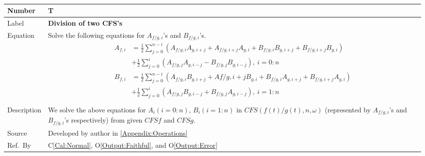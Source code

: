 \documentclass[12pt]{article}
\newcommand{\colAwidth}{0.13\textwidth}
\newcommand{\colBwidth}{0.82\textwidth}
\newcounter{theorynum} %
\newcommand{\calref}[1]{C\ref{#1}}
\newcommand{\oref}[1]{O\ref{#1}}
\begin{document}
~\newline
\noindent
\begin{minipage}{\textwidth}
	\renewcommand*{\arraystretch}{1.5}
	\begin{tabular}{| p{\colAwidth} | p{\colBwidth}|}
		\hline
		\rowcolor[gray]{0.9}
		Number& T{theorynum}\thetheorynum 
		\label{T:Division}\\
		\hline
		Label&\bf Division of two CFS's\\
		\hline
		Equation& Solve the following equations for $A_{f/g, i}$'s 
		and $B_{f/g, i}$'s.   
		\begin{equation}
		\begin{aligned}
		A_{f, i}&=\frac{1}{2}\sum_{j=0}^{n-i}(A_{f/g,i}A_{g,i+j}
		+A_{f/g, i+j}A_{g, i}+B_{f/g,i}B_{g,i+j}+B_{f/g,i+j}B_{g,i})\\
		&+\frac{1}{2}\sum_{j=0}^{i}(A_{f/g,j}A_{g,i-j}-B_{f/g,j}B_{g,i-j}),
		~i=0:n\\
		B_{f, i}&=\frac{1}{2}\sum_{j=0}^{n-i}(A_{f/g,i}B_{g,i+j}
		+A{f/g, i+j}B_{g, i}+B_{f/g,i}A_{g,i+j}+B_{f/g,i+j}A_{g,i})\\
		&+\frac{1}{2}\sum_{j=0}^{i}(A_{f/g,j}B_{g,i-j}+B_{f/g,j}A_{g,i-j}),
		~i=1:n\\
		\end{aligned}
		\end{equation}\\
		\hline
		Description & We solve the above equations for 
		$A_i(i=0:n)$, $B_i(i=1:n)$ in $\mathit{CFS}(f(t)/g(t), n, \omega)$ 
		(represented by $A_{f/g, i}$'s and $B_{f/g, i}$'s respectively) 
		from given $\mathit{CFSf}$ and $\mathit{CFSg}$.\\
		\hline
		Source & Developed by author in \autoref{Appendix:Operations}\\
		\hline
		Ref.\ By &  \calref{Cal:Normal}, 
		\oref{Output:Faithful}, 
		and \oref{Output:Error}\\
		\hline
	\end{tabular}
\end{minipage}\\
\end{document}
